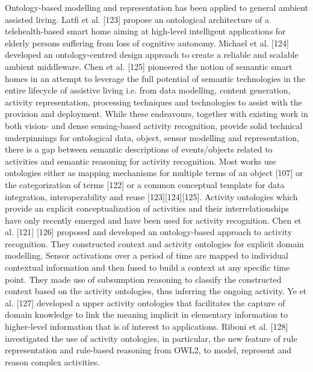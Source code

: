 Ontology-based modelling and representation has been applied to general ambient assisted living. Latfi et al. [123] propose an ontological architecture of a telehealth-based smart home aiming at high-level intelligent applications for elderly persons suffering from loss of cognitive autonomy. Michael et al. [124] developed an ontology-centred design approach to create a reliable and scalable ambient middleware. Chen et al. [125] pioneered the notion of semantic smart homes in an attempt to leverage the full potential of semantic technologies in the entire lifecycle of assistive living i.e. from data modelling, content generation, activity representation, processing techniques and technologies to assist with the provision and deployment. While these endeavours, together with existing work in both vision- and dense sensing-based activity recognition, provide solid technical underpinnings for ontological data, object, sensor modelling and representation, there is a gap between semantic descriptions of events/objects related to activities and semantic reasoning for activity recognition. Most works use ontologies either as mapping mechanisms for multiple terms of an object [107] or the categorization of terms [122] or a common conceptual template for data integration, interoperability and reuse [123][124][125]. Activity ontologies which provide an explicit conceptualization of activities and their interrelationships have only recently emerged and have been used for activity recognition. Chen et al. [121] [126] proposed and developed an ontology-based approach to activity recognition. They constructed context and activity ontologies for explicit domain modelling. Sensor activations over a period of time are mapped to individual contextual information and then fused to build a context at any specific time point. They made use of subsumption reasoning to classify the constructed context based on the activity ontologies, thus inferring the ongoing activity. Ye et al. [127] developed a upper activity ontologies that facilitates the capture of domain knowledge to link the meaning implicit in elementary information to higher-level information that is of interest to applications. Riboni et al. [128] investigated the use of activity ontologies, in particular, the new feature of rule representation and rule-based reasoning from OWL2, to model, represent and reason complex activities.

